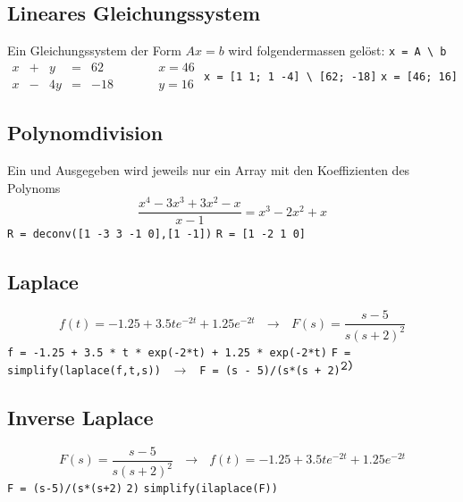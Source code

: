 \subsection{Lineares Gleichungssystem}
Ein Gleichungssystem der Form $ Ax = b $ wird folgendermassen gelöst: \newline
\verb?x = A \ b? \newline
  $ \begin{array}{ccccccc}
   x & + & y & = & 62 & ~~~~~~~~~ & x = 46 \\
   x & - & 4y & = & -18 & & y = 16
  \end{array} $
\hspace{5mm}
\hspace{10mm}
\verb?x = [1 1; 1 -4] \ [62; -18]? \hspace{5mm} \verb?x = [46; 16]?

\subsection{Polynomdivision}
Ein und Ausgegeben wird jeweils nur ein Array mit den Koeffizienten des Polynoms
\newline
$$ \frac{x^4 - 3x^3 + 3x^2 - x}{x-1} = x^3 - 2x^2 + x $$
\verb?R = deconv([1 -3 3 -1 0],[1 -1])? \hspace{5mm} \verb?R = [1 -2 1 0]?

\subsection{Laplace}
$$ f(t) = -1.25 + 3.5t e^{-2t} + 1.25 e^{-2t} ~~~ \rightarrow ~~~
F(s) = \frac{s-5}{s(s+2)^2} $$
\verb?f = -1.25 + 3.5 * t * exp(-2*t) + 1.25 * exp(-2*t)? \newline
\verb?F = simplify(laplace(f,t,s))? $ ~~ \rightarrow ~~ $
\verb?F = (s - 5)/(s*(s + 2)?$^{ \verb?2)? } $

\subsection{Inverse Laplace}
$$ F(s) = \frac{s-5}{s(s+2)^2} ~~~ \rightarrow ~~~ f(t) = -1.25 + 3.5t e^{-2t} +
1.25 e^{-2t} $$
\verb?F = (s-5)/(s*(s+2)? \texttt{\hoch} \verb?2)? \hspace{5mm}
\verb?simplify(ilaplace(F))?

